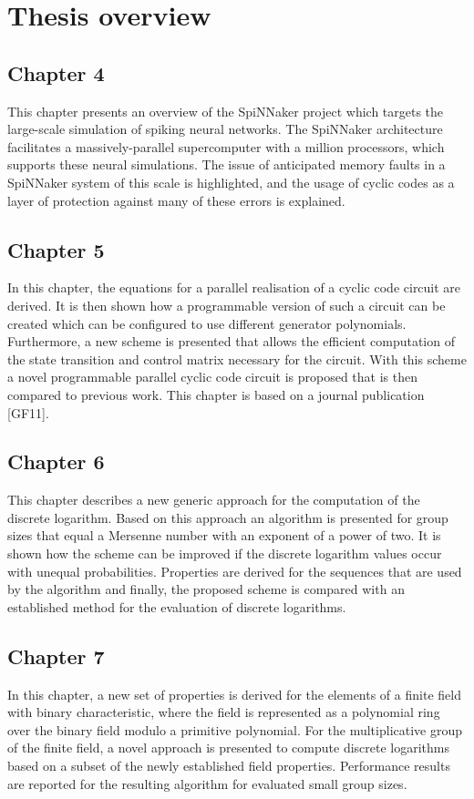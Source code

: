 \documentclass[oneside, a4paper, 11pt]{memoir}
\begin{document}
\section{Thesis overview}
\subsection{Chapter 4}
This chapter presents an overview of the SpiNNaker project which targets the large-scale simulation of spiking neural networks. The SpiNNaker architecture facilitates a massively-parallel supercomputer with a million processors, which supports these neural simulations. The issue of anticipated memory faults in a SpiNNaker system of this scale is highlighted, and the usage of cyclic codes as a layer of protection against many of these errors is explained.

\subsection{Chapter 5}
In this chapter, the equations for a parallel realisation of a cyclic code circuit are derived. It is then shown how a programmable version of such a circuit can be created which can be configured to use different generator polynomials. Furthermore, a new scheme is presented that allows the efficient computation of the state transition and control matrix necessary for the circuit. With this scheme a novel programmable parallel cyclic code circuit is proposed that is then compared to previous work. This chapter is based on a journal publication [GF11].

\subsection{Chapter 6}
This chapter describes a new generic approach for the computation of the discrete logarithm. Based on this approach an algorithm is presented for group sizes that equal a Mersenne number with an exponent of a power of two. It is shown how the scheme can be improved if the discrete logarithm values occur with unequal probabilities. Properties are derived for the sequences that are used by the algorithm and finally, the proposed scheme is compared with an established method for the evaluation of discrete logarithms.

\subsection{Chapter 7}
In this chapter, a new set of properties is derived for the elements of a finite field with binary characteristic, where the field is represented as a polynomial ring over the binary field modulo a primitive polynomial. For the multiplicative group of the finite field, a novel approach is presented to compute discrete logarithms based on a subset of the newly established field properties. Performance results are reported for the resulting algorithm for evaluated small group sizes.
\end{document}
